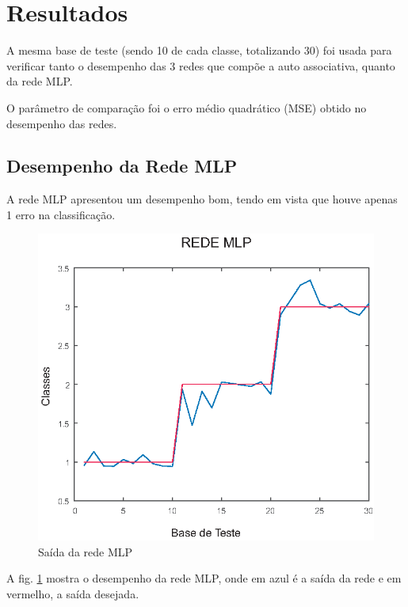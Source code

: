 \section{Resultados} \label{resultados}

A mesma base de teste (sendo 10 de cada classe, totalizando 30) foi usada para verificar tanto o desempenho das 3 redes que compõe a auto associativa, quanto da rede MLP.

O parâmetro de comparação foi o erro médio quadrático (MSE) obtido no desempenho das redes.


\subsection{Desempenho da Rede MLP}

A rede MLP apresentou um desempenho bom, tendo em vista que houve apenas 1 erro na classificação.

\begin{figure}[H]

\centering %
\includegraphics{04-Figuras/SAIDA_MLP}

\caption{Saída da rede MLP}

\label{figura:saidaMLP}

\end{figure}

A fig. \ref{figura:saidaMLP} mostra o desempenho da rede MLP, onde em azul é a saída da rede e em vermelho, a saída desejada.


